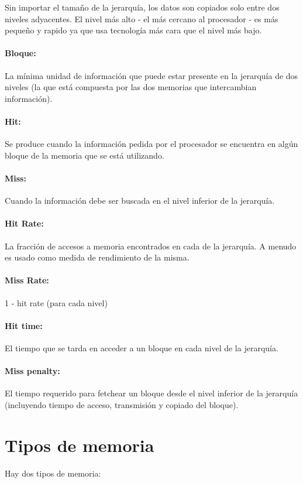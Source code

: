 Sin importar el tamaño de la jerarquía, los datos son copiados solo entre dos niveles adyacentes. El nivel más alto - el más cercano al procesador - es más pequeño y rapido ya que usa tecnología más cara que el nivel más bajo.

\paragraph{Bloque:} La mínima unidad de información que puede estar presente en la jerarquía de dos niveles (la que está compuesta por las dos memorias que intercambian información).

\paragraph{Hit:} Se produce cuando la información pedida por el procesador se encuentra en algún bloque de la memoria que se está utilizando.

\paragraph{Miss:} Cuando la información debe ser buscada en el nivel inferior de la jerarquía.

\paragraph{Hit Rate:} La fracción de accesos a memoria encontrados en cada de la jerarquía. A menudo es usado como medida de rendimiento de la misma.

\paragraph{Miss Rate: } 1 - hit rate (para cada nivel)

\paragraph{Hit time:} El tiempo que se tarda en acceder a un bloque en cada nivel de la jerarquía.

\paragraph{Miss penalty:} El tiempo requerido para fetchear un bloque desde el nivel inferior de la jerarquía (incluyendo tiempo de acceso, transmisión y copiado del bloque).

\newpage
\section{Tipos de memoria}\label{sec::Memoria::Tipos}
Hay dos tipos de memoria:


